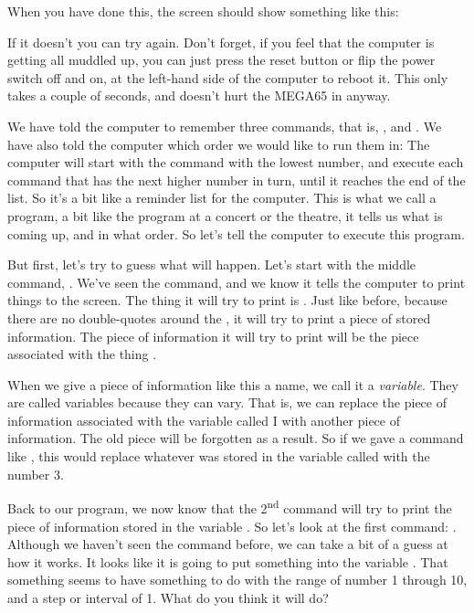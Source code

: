 \needspace{4cm} %
When you have done this, the screen should show something like this:


If it doesn't you
can try again. Don't forget, if you feel that the computer is getting all muddled up,
you can just press the reset button or flip the power switch off and on, at the left-hand side of the
computer to reboot it. This only takes a couple of seconds, and doesn't hurt the MEGA65
in anyway.

We have told the computer to remember three commands, that is, ,
and .  We have also told the computer which order we would like to run them in: The
computer will start with the command with the lowest number, and execute each command that
has the next higher number in turn, until it reaches the end of the list.  So it's a bit like
a reminder list for the computer. This is what we call a program, a bit like the program at
a concert or the theatre, it tells us what is coming up, and in what order.
So let's tell the computer to execute this program.

But first, let's try to guess what will happen.  Let's start with the middle command, .
We've seen the  command, and we know it tells the computer to print things to the screen.
The thing it will try to print is .  Just like before, because there are no double-quotes
around the , it will try to print a piece of stored information.  The piece of information
it will try to print will be the piece associated with the thing .

When we give a piece of
information like this a name, we call it a {\em variable}.  They are called
variables because they can vary.  That is, we can replace the piece of information associated
with the variable called I with another piece of information.  The old piece will be forgotten
as a result.  So if we gave a command like , this would replace whatever was stored
in the variable called  with the number 3.

Back to our program, we now know that the 2\textsuperscript{nd} command will try to print the piece of information
stored in the variable .  So let's look at the first command: .  Although
we haven't seen the  command before, we can take a bit of a guess at how it works. It looks like
it is going to put something into the variable .  That something seems to have something to do
with the range of number 1 through 10, and a step or interval of 1.  What do you think it will do?

